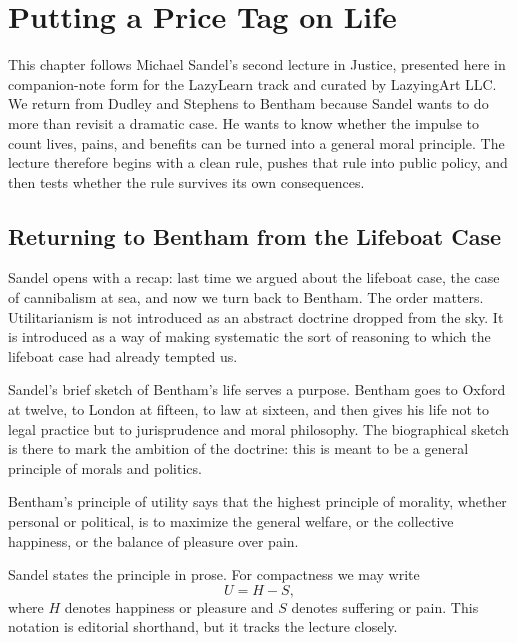 \chapter{Putting a Price Tag on Life}

This chapter follows Michael Sandel's second lecture in Justice, presented here in companion-note form for the LazyLearn track and curated by LazyingArt LLC. We return from Dudley and Stephens to Bentham because Sandel wants to do more than revisit a dramatic case. He wants to know whether the impulse to count lives, pains, and benefits can be turned into a general moral principle. The lecture therefore begins with a clean rule, pushes that rule into public policy, and then tests whether the rule survives its own consequences.

\section{Returning to Bentham from the Lifeboat Case}

Sandel opens with a recap: last time we argued about the lifeboat case, the case of cannibalism at sea, and now we turn back to Bentham. The order matters. Utilitarianism is not introduced as an abstract doctrine dropped from the sky. It is introduced as a way of making systematic the sort of reasoning to which the lifeboat case had already tempted us.

Sandel's brief sketch of Bentham's life serves a purpose. Bentham goes to Oxford at twelve, to London at fifteen, to law at sixteen, and then gives his life not to legal practice but to jurisprudence and moral philosophy. The biographical sketch is there to mark the ambition of the doctrine: this is meant to be a general principle of morals and politics.

\begin{definition}
Bentham's principle of utility says that the highest principle of morality, whether personal or political, is to maximize the general welfare, or the collective happiness, or the balance of pleasure over pain.
\end{definition}

Sandel states the principle in prose. For compactness we may write
\begin{equation}
U = H - S,
\end{equation}
where \(H\) denotes happiness or pleasure and \(S\) denotes suffering or pain. This notation is editorial shorthand, but it tracks the lecture closely.

